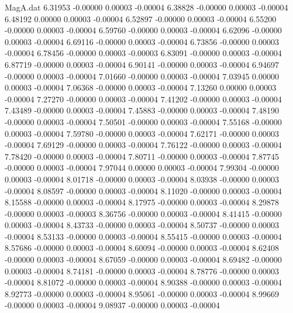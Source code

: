 \begin{filecontents}{MagA.dat}
   6.31953   -0.00000    0.00003   -0.00004
   6.38828   -0.00000    0.00003   -0.00004
   6.48192    0.00000    0.00003   -0.00004
   6.52897   -0.00000    0.00003   -0.00004
   6.55200   -0.00000    0.00003   -0.00004
   6.59760   -0.00000    0.00003   -0.00004
   6.62096   -0.00000    0.00003   -0.00004
   6.69116   -0.00000    0.00003   -0.00004
   6.73856   -0.00000    0.00003   -0.00004
   6.78456   -0.00000    0.00003   -0.00003
   6.83091   -0.00000    0.00003   -0.00004
   6.87719   -0.00000    0.00003   -0.00004
   6.90141   -0.00000    0.00003   -0.00004
   6.94697   -0.00000    0.00003   -0.00004
   7.01660   -0.00000    0.00003   -0.00004
   7.03945    0.00000    0.00003   -0.00004
   7.06368   -0.00000    0.00003   -0.00004
   7.13260    0.00000    0.00003   -0.00004
   7.27270   -0.00000    0.00003   -0.00004
   7.41202   -0.00000    0.00003   -0.00004
   7.43489   -0.00000    0.00003   -0.00004
   7.45883   -0.00000    0.00003   -0.00004
   7.48190   -0.00000    0.00003   -0.00004
   7.50501   -0.00000    0.00003   -0.00004
   7.55168   -0.00000    0.00003   -0.00004
   7.59780   -0.00000    0.00003   -0.00004
   7.62171   -0.00000    0.00003   -0.00004
   7.69129   -0.00000    0.00003   -0.00004
   7.76122   -0.00000    0.00003   -0.00004
   7.78420   -0.00000    0.00003   -0.00004
   7.80711   -0.00000    0.00003   -0.00004
   7.87745   -0.00000    0.00003   -0.00004
   7.97044    0.00000    0.00003   -0.00004
   7.99304   -0.00000    0.00003   -0.00004
   8.01718   -0.00000    0.00003   -0.00004
   8.03938   -0.00000    0.00003   -0.00004
   8.08597   -0.00000    0.00003   -0.00004
   8.11020   -0.00000    0.00003   -0.00004
   8.15588   -0.00000    0.00003   -0.00004
   8.17975   -0.00000    0.00003   -0.00004
   8.29878   -0.00000    0.00003   -0.00003
   8.36756   -0.00000    0.00003   -0.00004
   8.41415   -0.00000    0.00003   -0.00004
   8.43733   -0.00000    0.00003   -0.00004
   8.50737   -0.00000    0.00003   -0.00004
   8.53133   -0.00000    0.00003   -0.00004
   8.55415   -0.00000    0.00003   -0.00004
   8.57686   -0.00000    0.00003   -0.00004
   8.60094   -0.00000    0.00003   -0.00004
   8.62408   -0.00000    0.00003   -0.00004
   8.67059   -0.00000    0.00003   -0.00004
   8.69482   -0.00000    0.00003   -0.00004
   8.74181   -0.00000    0.00003   -0.00004
   8.78776   -0.00000    0.00003   -0.00004
   8.81072   -0.00000    0.00003   -0.00004
   8.90388   -0.00000    0.00003   -0.00004
   8.92773   -0.00000    0.00003   -0.00004
   8.95061   -0.00000    0.00003   -0.00004
   8.99669   -0.00000    0.00003   -0.00004
   9.08937   -0.00000    0.00003   -0.00004

\end{filecontents}
